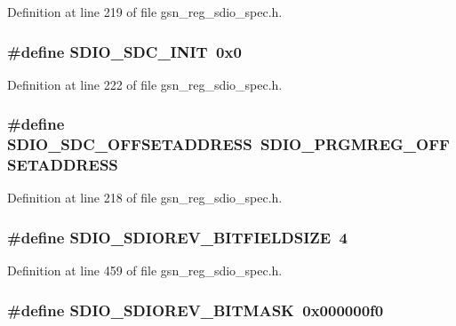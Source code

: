 Definition at line 219 of file gsn\_\-reg\_\-sdio\_\-spec.h.

\hypertarget{a00571_ab3e84c908938ed7b49eb458abfa7a680}{
\subsubsection[{SDIO\_\-SDC\_\-INIT}]{\setlength{\rightskip}{0pt plus 5cm}\#define SDIO\_\-SDC\_\-INIT~0x0}}
\label{a00571_ab3e84c908938ed7b49eb458abfa7a680}


Definition at line 222 of file gsn\_\-reg\_\-sdio\_\-spec.h.

\hypertarget{a00571_abf27b5f57081a6b1d0b7baa03a359fb0}{
\subsubsection[{SDIO\_\-SDC\_\-OFFSETADDRESS}]{\setlength{\rightskip}{0pt plus 5cm}\#define SDIO\_\-SDC\_\-OFFSETADDRESS~SDIO\_\-PRGMREG\_\-OFFSETADDRESS}}
\label{a00571_abf27b5f57081a6b1d0b7baa03a359fb0}


Definition at line 218 of file gsn\_\-reg\_\-sdio\_\-spec.h.

\hypertarget{a00571_a11219b982b00cc922408a71110b78db6}{
\subsubsection[{SDIO\_\-SDIOREV\_\-BITFIELDSIZE}]{\setlength{\rightskip}{0pt plus 5cm}\#define SDIO\_\-SDIOREV\_\-BITFIELDSIZE~4}}
\label{a00571_a11219b982b00cc922408a71110b78db6}


Definition at line 459 of file gsn\_\-reg\_\-sdio\_\-spec.h.

\hypertarget{a00571_ac517380f2d1ed3e3d0822f6bf10dfd34}{
\subsubsection[{SDIO\_\-SDIOREV\_\-BITMASK}]{\setlength{\rightskip}{0pt plus 5cm}\#define SDIO\_\-SDIOREV\_\-BITMASK~0x000000f0}}
\label{a00571_ac517380f2d1ed3e3d0822f6bf10dfd34}


